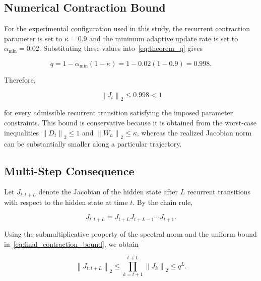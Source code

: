 \documentclass[journal]{IEEEtran}
\begin{document}
	\subsection{Numerical Contraction Bound}
	\label{subsec:numerical_bound}
	
	For the experimental configuration used in this study, the recurrent contraction parameter is set to $\kappa=0.9$ and the minimum adaptive update rate is set to $\alpha_{\min}=0.02$. Substituting these values into~\eqref{eq:theorem_q} gives
	
	\begin{equation}
		q
		=
		1-\alpha_{\min}(1-\kappa)
		=
		1-0.02(1-0.9)
		=
		0.998.
		\label{eq:numerical_q}
	\end{equation}
	
	Therefore,
	
	\begin{equation}
		\boxed{
			\left\lVert J_t\right\rVert_2
			\leq
			0.998
			<
			1
		}
		\label{eq:final_contraction_bound}
	\end{equation}
	
	for every admissible recurrent transition satisfying the imposed parameter constraints. This bound is conservative because it is obtained from the worst-case inequalities $\left\lVert D_t\right\rVert_2\leq1$ and $\left\lVert W_h\right\rVert_2\leq\kappa$, whereas the realized Jacobian norm can be substantially smaller along a particular trajectory.
	
	
	\subsection{Multi-Step Consequence}
	\label{subsec:multistep}
	
	Let $J_{t:t+L}$ denote the Jacobian of the hidden state after $L$ recurrent transitions with respect to the hidden state at time $t$. By the chain rule,
	
	\begin{equation}
		J_{t:t+L}
		=
		J_{t+L}J_{t+L-1}\cdots J_{t+1}.
		\label{eq:jacobian_product}
	\end{equation}
	
	Using the submultiplicative property of the spectral norm and the uniform bound in~\eqref{eq:final_contraction_bound}, we obtain
	
	\begin{equation}
		\left\lVert J_{t:t+L}\right\rVert_2
		\leq
		\prod_{k=t+1}^{t+L}
		\left\lVert J_k\right\rVert_2
		\leq
		q^L.
		\label{eq:multistep_bound}
	\end{equation}
	
\end{document}
